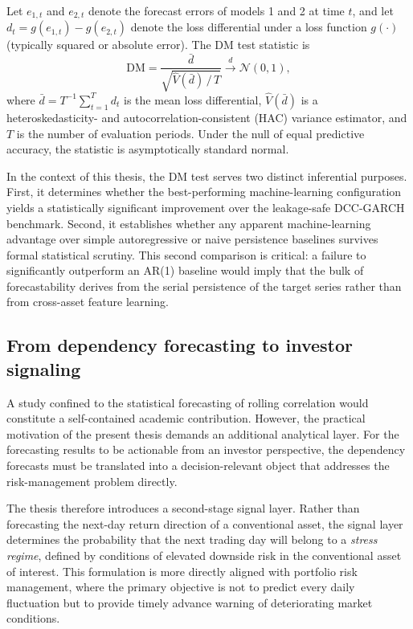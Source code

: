 Let $e_{1,t}$ and $e_{2,t}$ denote the forecast errors of models 1 and 2 at time $t$, and let $d_t = g(e_{1,t}) - g(e_{2,t})$ denote the loss differential under a loss function $g(\cdot)$ (typically squared or absolute error). The DM test statistic is
\begin{equation}
    \mathrm{DM} = \frac{\bar{d}}{\sqrt{\hat{V}(\bar{d})\,/\, T}} \xrightarrow{d} \mathcal{N}(0,1),
\end{equation}
where $\bar{d} = T^{-1}\sum_{t=1}^{T} d_t$ is the mean loss differential, $\hat{V}(\bar{d})$ is a heteroskedasticity- and autocorrelation-consistent (HAC) variance estimator, and $T$ is the number of evaluation periods. Under the null of equal predictive accuracy, the statistic is asymptotically standard normal.

In the context of this thesis, the DM test serves two distinct inferential purposes. First, it determines whether the best-performing machine-learning configuration yields a statistically significant improvement over the leakage-safe DCC-GARCH benchmark. Second, it establishes whether any apparent machine-learning advantage over simple autoregressive or naive persistence baselines survives formal statistical scrutiny. This second comparison is critical: a failure to significantly outperform an AR(1) baseline would imply that the bulk of forecastability derives from the serial persistence of the target series rather than from cross-asset feature learning.

\subsection{From dependency forecasting to investor signaling}

A study confined to the statistical forecasting of rolling correlation would constitute a self-contained academic contribution. However, the practical motivation of the present thesis demands an additional analytical layer. For the forecasting results to be actionable from an investor perspective, the dependency forecasts must be translated into a decision-relevant object that addresses the risk-management problem directly.

The thesis therefore introduces a second-stage signal layer. Rather than forecasting the next-day return direction of a conventional asset, the signal layer determines the probability that the next trading day will belong to a \emph{stress regime}, defined by conditions of elevated downside risk in the conventional asset of interest. This formulation is more directly aligned with portfolio risk management, where the primary objective is not to predict every daily fluctuation but to provide timely advance warning of deteriorating market conditions.

